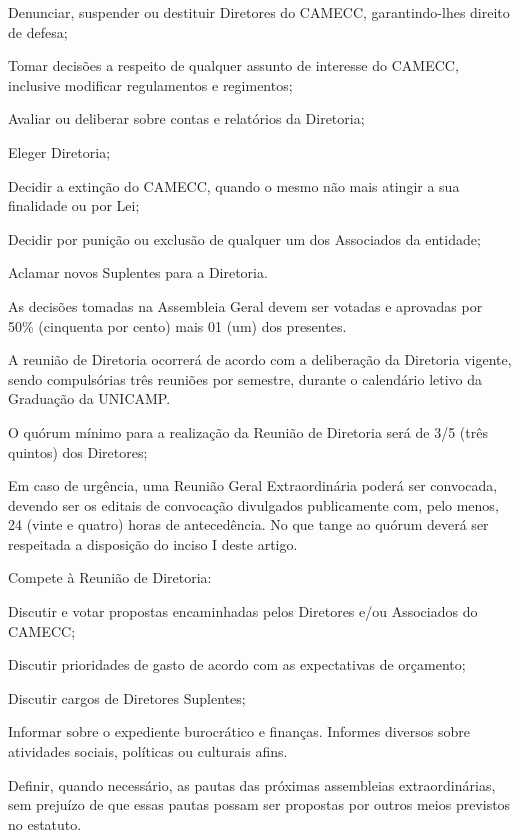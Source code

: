 \documentclass{estatuto}
\begin{document}
\inciso Denunciar, suspender ou destituir Diretores do CAMECC, garantindo-lhes direito de defesa;

\inciso Tomar decisões a respeito de qualquer assunto de interesse do CAMECC, inclusive modificar regulamentos e regimentos;

\inciso Avaliar ou deliberar sobre contas e relatórios da Diretoria;

\inciso Eleger Diretoria;

\inciso Decidir a extinção do CAMECC, quando o mesmo não mais atingir a sua finalidade ou por Lei;

\inciso Decidir por punição ou exclusão de qualquer um dos Associados da entidade;

\inciso Aclamar novos Suplentes para a Diretoria.

\paragrafounico As decisões tomadas na Assembleia Geral devem ser votadas e aprovadas por 50\% (cinquenta por cento) mais 01 (um) dos presentes.


\artigo A reunião de Diretoria ocorrerá de acordo com a deliberação da Diretoria vigente, sendo compulsórias três reuniões por semestre, durante o calendário letivo da Graduação da UNICAMP.

\inciso O quórum mínimo para a realização da Reunião de Diretoria será de 3/5 (três quintos) dos Diretores;

\inciso Em caso de urgência, uma Reunião Geral Extraordinária poderá ser convocada, devendo ser os editais de convocação divulgados publicamente com, pelo menos, 24 (vinte e quatro) horas de antecedência. No que tange ao quórum deverá ser respeitada a disposição do inciso I deste artigo.

\artigo Compete à Reunião de Diretoria:

\inciso Discutir e votar propostas encaminhadas pelos Diretores e/ou Associados do CAMECC;

\inciso Discutir prioridades de gasto de acordo com as expectativas de orçamento;

\inciso Discutir cargos de Diretores Suplentes;

\inciso Informar sobre o expediente burocrático e finanças. Informes diversos sobre atividades sociais, políticas ou culturais afins.

\inciso Definir, quando necessário, as pautas das próximas assembleias extraordinárias, sem prejuízo de que essas pautas possam ser propostas por outros meios previstos no estatuto.
\end{document}
